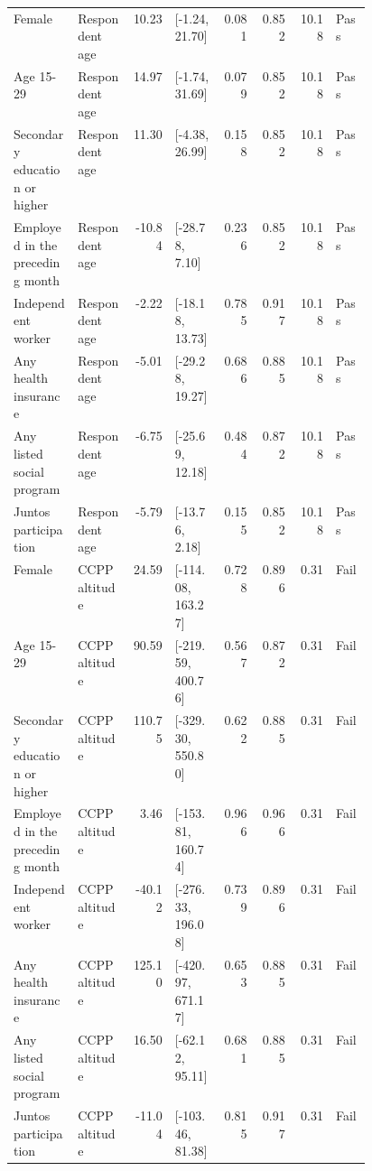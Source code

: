 \begin{longtable}{@{}p{0.18\linewidth}p{0.15\linewidth}rp{0.13\linewidth}rrrl@{}}
Female & Respondent age & 10.23 & [-1.24, 21.70] & 0.081 & 0.852 & 10.18 & Pass \\
Age 15-29 & Respondent age & 14.97 & [-1.74, 31.69] & 0.079 & 0.852 & 10.18 & Pass \\
Secondary education or higher & Respondent age & 11.30 & [-4.38, 26.99] & 0.158 & 0.852 & 10.18 & Pass \\
Employed in the preceding month & Respondent age & -10.84 & [-28.78, 7.10] & 0.236 & 0.852 & 10.18 & Pass \\
Independent worker & Respondent age & -2.22 & [-18.18, 13.73] & 0.785 & 0.917 & 10.18 & Pass \\
Any health insurance & Respondent age & -5.01 & [-29.28, 19.27] & 0.686 & 0.885 & 10.18 & Pass \\
Any listed social program & Respondent age & -6.75 & [-25.69, 12.18] & 0.484 & 0.872 & 10.18 & Pass \\
Juntos participation & Respondent age & -5.79 & [-13.76, 2.18] & 0.155 & 0.852 & 10.18 & Pass \\
Female & CCPP altitude & 24.59 & [-114.08, 163.27] & 0.728 & 0.896 & 0.31 & Fail \\
Age 15-29 & CCPP altitude & 90.59 & [-219.59, 400.76] & 0.567 & 0.872 & 0.31 & Fail \\
Secondary education or higher & CCPP altitude & 110.75 & [-329.30, 550.80] & 0.622 & 0.885 & 0.31 & Fail \\
Employed in the preceding month & CCPP altitude & 3.46 & [-153.81, 160.74] & 0.966 & 0.966 & 0.31 & Fail \\
Independent worker & CCPP altitude & -40.12 & [-276.33, 196.08] & 0.739 & 0.896 & 0.31 & Fail \\
Any health insurance & CCPP altitude & 125.10 & [-420.97, 671.17] & 0.653 & 0.885 & 0.31 & Fail \\
Any listed social program & CCPP altitude & 16.50 & [-62.12, 95.11] & 0.681 & 0.885 & 0.31 & Fail \\
Juntos participation & CCPP altitude & -11.04 & [-103.46, 81.38] & 0.815 & 0.917 & 0.31 & Fail \\
\end{longtable}
\endgroup
